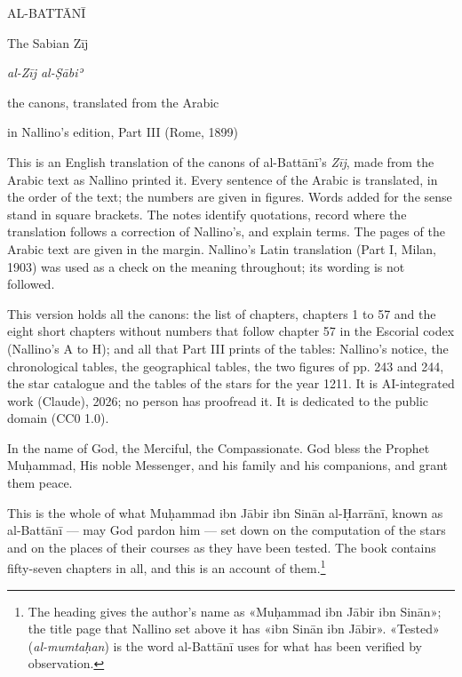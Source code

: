 \documentclass[11pt]{article}
\newcommand{\ArPage}[1]{\marginpar{\footnotesize\color{gray}Ar.\,p.\,#1}}
\begin{document}
\thispagestyle{empty}
\begin{center}\Large AL-BATTĀNĪ\par\vspace{4mm}\LARGE The Sabian Zīj\par\vspace{2mm}\large \emph{al-Zīj al-Ṣābiʾ}\par\vspace{5mm}\normalsize the canons, translated from the Arabic\par\vspace{2mm}in Nallino's edition, Part III (Rome, 1899)\end{center}\vspace{8mm}
\noindent This is an English translation of the canons of al-Battānī's \emph{Zīj}, made from the Arabic text as Nallino printed it. Every sentence of the Arabic is translated, in the order of the text; the numbers are given in figures. Words added for the sense stand in square brackets. The notes identify quotations, record where the translation follows a correction of Nallino's, and explain terms. The pages of the Arabic text are given in the margin. Nallino's Latin translation (Part I, Milan, 1903) was used as a check on the meaning throughout; its wording is not followed.
\par\smallskip\noindent This version holds all the canons: the list of chapters, chapters 1 to 57 and the eight short chapters without numbers that follow chapter 57 in the Escorial codex (Nallino's A to H); and all that Part III prints of the tables: Nallino's notice, the chronological tables, the geographical tables, the two figures of pp. 243 and 244, the star catalogue and the tables of the stars for the year 1211. It is AI-integrated work (Claude), 2026; no person has proofread it. It is dedicated to the public domain (CC0 1.0).
\par\clearpage
\begin{center}\ArPage{1}In the name of God, the Merciful, the Compassionate. God bless the Prophet Muḥammad, His noble Messenger, and his family and his companions, and grant them peace.\end{center}
\par This is the whole of what Muḥammad ibn Jābir ibn Sinān al-Ḥarrānī, known as al-Battānī — may God pardon him — set down on the computation of the stars and on the places of their courses as they have been tested. The book contains fifty-seven chapters in all, and this is an account of them.\footnote{The heading gives the author's name as «Muḥammad ibn Jābir ibn Sinān»; the title page that Nallino set above it has «ibn Sinān ibn Jābir». «Tested» (\emph{al-mumtaḥan}) is the word al-Battānī uses for what has been verified by observation.}\par
\end{document}
